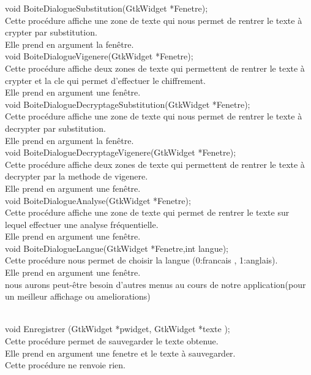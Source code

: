 \documentclass[a4]{article}
\begin{document}
	void BoiteDialogueSubstitution(GtkWidget *Fenetre);\\
		Cette procédure affiche une zone de texte qui nous permet de rentrer le texte à crypter par substitution.\\
		Elle prend en argument la fenêtre.\\
	
	void BoiteDialogueVigenere(GtkWidget *Fenetre);\\
		Cette procédure affiche deux zones de texte qui permettent de rentrer le texte à crypter et la cle qui permet d'effectuer le chiffrement.\\
		Elle prend en argument une fenêtre.\\
		
	void BoiteDialogueDecryptageSubstitution(GtkWidget *Fenetre);\\
		Cette procédure affiche une zone de texte qui nous permet de rentrer le texte à decrypter par substitution.\\
		Elle prend en argument la fenêtre.\\
	
	void BoiteDialogueDecryptageVigenere(GtkWidget *Fenetre);\\
		Cette procédure affiche deux zones de texte qui permettent de rentrer le texte à decrypter par la methode de vigenere.\\
		Elle prend en argument une fenêtre.\\
		
	void BoiteDialogueAnalyse(GtkWidget *Fenetre);\\
		Cette procédure affiche une zone de texte qui permet de rentrer le texte sur lequel effectuer une analyse fréquentielle.\\
		Elle prend en argument une fenêtre.\\
		
	void BoiteDialogueLangue(GtkWidget *Fenetre,int langue);\\
		Cette procédure nous permet de choisir la langue (0:francais , 1:anglais).\\
		Elle prend en argument une fenêtre.\\
		
	nous aurons peut-être besoin d'autres menus au cours de notre application(pour un meilleur affichage ou ameliorations) 
	
	\\
	
	void Enregistrer (GtkWidget *pwidget, GtkWidget *texte );\\
		Cette procédure permet de sauvegarder le texte obtenue.\\
		Elle prend en argument une fenetre et le texte à sauvegarder.\\
		Cette procédure ne renvoie rien.\\
	
\end{document}
